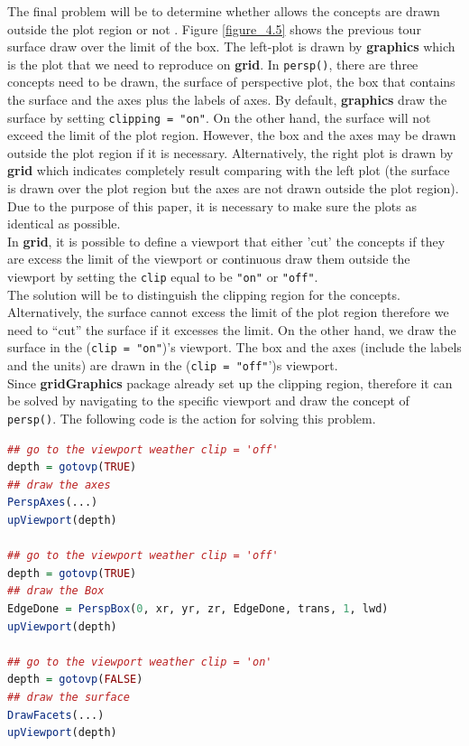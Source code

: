 \documentclass[11pt,twoside]{report}
\begin{document}
\newpage
The final problem will be to determine whether allows the concepts are drawn outside the plot region or not . Figure \ref{figure_4.5} shows the previous tour surface draw over the limit of the box. The left-plot is drawn by \textbf{graphics} which is the plot that we need to reproduce on \textbf{grid}. In \texttt{persp()}, there are three concepts need to be drawn, the surface of perspective plot, the box that contains the surface and the axes plus the labels of axes. By default, \textbf{graphics} draw the surface by setting \texttt{clipping = "on"}. On the other hand, the surface will not exceed the limit of the plot region. However, the box and the axes may be drawn outside the plot region if it is necessary. Alternatively, the right plot is drawn by \textbf{grid} which indicates completely result comparing with the left plot (the surface is drawn over the plot region but the axes are not drawn outside the plot region). Due to the purpose of this paper, it is necessary to make sure the plots as identical as possible.\\

In \textbf{grid}, it is possible to define a viewport that either 'cut' the concepts if they are excess the limit of the viewport or continuous draw them outside the viewport by setting the \texttt{clip} equal to be \texttt{"on"} or \texttt{"off"}.\\

The solution will be to distinguish the clipping region for the concepts. Alternatively, the surface cannot excess the limit of the plot region therefore we need to ``cut'' the surface if it excesses the limit. On the other hand, we draw the surface in the (\texttt{clip = "on"})'s viewport. The box and the axes (include the labels and the units) are drawn in the (\texttt{clip = "off"}')s viewport.\\
Since \textbf{gridGraphics} package already set up the clipping region, therefore it can be solved by navigating to the specific viewport and draw the concept of \texttt{persp()}. The following code is the action for solving this problem.

\begin{lstlisting}[language = R]
## go to the viewport weather clip = 'off'
depth = gotovp(TRUE)
## draw the axes
PerspAxes(...)
upViewport(depth)

## go to the viewport weather clip = 'off'
depth = gotovp(TRUE)
## draw the Box
EdgeDone = PerspBox(0, xr, yr, zr, EdgeDone, trans, 1, lwd)
upViewport(depth)

## go to the viewport weather clip = 'on'
depth = gotovp(FALSE)
## draw the surface
DrawFacets(...)
upViewport(depth)
\end{lstlisting}\\
\end{document}
